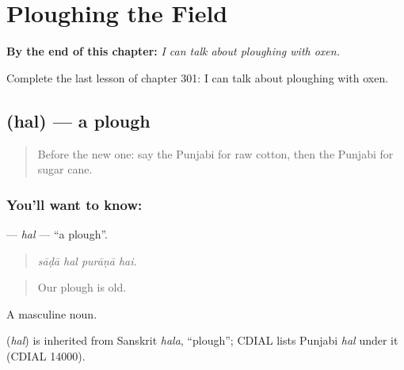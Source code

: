 
\chapter{Ploughing the Field}
\label{ch:pa-a2-ploughing-the-field}

\begin{chapteropening}
\textbf{By the end of this chapter:} \emph{I can talk about ploughing with oxen.}

Complete the last lesson of chapter 301: I can talk about ploughing with oxen.
\end{chapteropening}

\section[\texorpdfstring{\pa{ਹਲ} (hal)}{ਹਲ (hal)}]{ (hal) — a plough}

\label{lesson:PA-C301-hal}



\begin{quote}
Before the new one: say the Punjabi for raw cotton, then the Punjabi for sugar cane.
\end{quote}

\subsection*{You'll want to know: }
\textbf{} — \emph{hal} — \textquotedblleft{}a plough\textquotedblright{}.

\begin{quote}
   
\end{quote}

\begin{quote}
\emph{sāḍā hal purāṇā hai.}
\end{quote}

\begin{quote}
Our plough is old.
\end{quote}

A masculine noun.

\begin{cousinweb}
\textbf{} (\emph{hal}) is inherited from Sanskrit \emph{hala}, \textquotedblleft{}plough\textquotedblright{}; CDIAL lists Punjabi \emph{hal} under it (CDIAL 14000).
\end{cousinweb}

